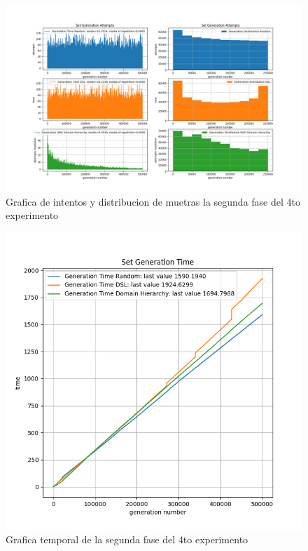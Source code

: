 \begin{figure}[!ht]
      \includegraphics[width=\linewidth]{Graphics/exp7.png}
      \caption{Grafica de intentos y distribucion de muetras la segunda fase del 4to experimento}
      \label{fig:exp7}
\end{figure}

\newpage

\begin{figure}[!ht]
      \includegraphics[width=\linewidth]{Graphics/exp6.png}
      \caption{Grafica temporal de la segunda fase del 4to experimento}
      \label{fig:exp6}
\end{figure}

